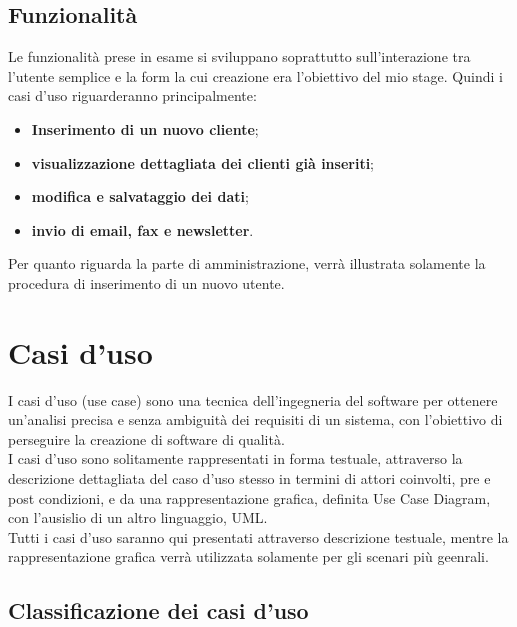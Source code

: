 \subsection{Funzionalità}
Le funzionalità prese in esame si sviluppano soprattutto sull'interazione tra l'utente semplice e la form la cui creazione era l'obiettivo del mio stage.
Quindi i casi d'uso riguarderanno principalmente:
\begin{itemize}
	\item \textbf{Inserimento di un nuovo cliente};
	\item \textbf{visualizzazione dettagliata dei clienti già inseriti};
	\item \textbf{modifica e salvataggio dei dati};
	\item \textbf{invio di email, fax e newsletter}.
\end{itemize}
Per quanto riguarda la parte di amministrazione, verrà illustrata solamente la procedura di inserimento di un nuovo utente.

\section{Casi d'uso}
I casi d'uso (use case) sono una tecnica dell'ingegneria del software per ottenere un'analisi precisa e senza ambiguità dei requisiti di un sistema, con l'obiettivo di perseguire la creazione di software di qualità.\\
I casi d'uso sono solitamente rappresentati in forma testuale, attraverso la descrizione dettagliata del caso d'uso stesso in termini di attori coinvolti, pre e post condizioni, e da una rappresentazione grafica, definita Use Case Diagram, con l'ausislio di un altro linguaggio, \gls{UML}.\\
Tutti i casi d'uso saranno qui presentati attraverso descrizione testuale, mentre la rappresentazione grafica verrà utilizzata solamente per gli scenari più geenrali.
\subsection{Classificazione dei casi d'uso}
